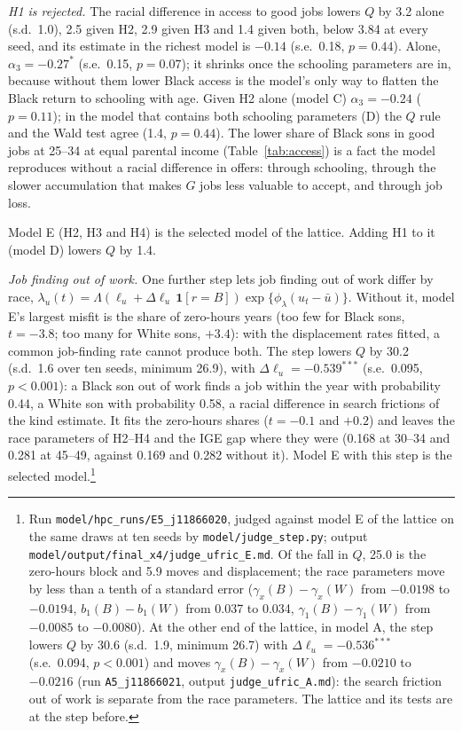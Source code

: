 \textit{H1 is rejected.} The racial difference in access to good jobs lowers $Q$ by 3.2 alone (s.d.\ 1.0), 2.5 given
H2, 2.9 given H3 and 1.4 given both, below 3.84 at every seed, and its estimate in the richest model is $-0.14$
(s.e.\ 0.18, $p = 0.44$). Alone, $\alpha_3 = -0.27^{*}$ (s.e.\ 0.15, $p = 0.07$); it shrinks once the schooling
parameters are in, because without them lower Black access is the model's only way to flatten the Black return to
schooling with age. Given H2 alone (model C) $\alpha_3 = -0.24$ ($p = 0.11$); in the model that contains both schooling
parameters (D) the $Q$ rule and the Wald test agree (1.4, $p = 0.44$). The lower share of Black sons in good jobs at 25--34 at equal parental income (Table~\ref{tab:access}) is a
fact the model reproduces without a racial difference in offers: through schooling, through the slower accumulation
that makes $G$ jobs less valuable to accept, and through job loss.

Model E (H2, H3 and H4) is the selected model of the lattice. Adding H1 to it (model D) lowers $Q$ by 1.4.

\textit{Job finding out of work.} One further step lets job finding out of work differ by race,
$\lambda_u(t) = \Lambda(\ell_u + \Delta\ell_u\, \mathbf 1[r = B])\exp\{\phi_\lambda(u_t - \bar u)\}$. Without it, model E's
largest misfit is the share of zero-hours years (too few for Black sons, $t = -3.8$; too many for White sons, $+3.4$):
with the displacement rates fitted, a common job-finding rate cannot produce both. The step lowers $Q$ by 30.2 (s.d.\
1.6 over ten seeds, minimum 26.9), with $\Delta\ell_u = -0.539^{***}$ (s.e.\ 0.095, $p < 0.001$): a Black son out of
work finds a job within the year with probability 0.44, a White son with probability 0.58, a racial difference in
search frictions of the kind \citet{bowlus2002discrimination} estimate. It fits the zero-hours shares ($t = -0.1$ and
$+0.2$) and leaves the race parameters of H2--H4 and the IGE gap where they were (0.168 at 30--34 and 0.281 at 45--49,
against 0.169 and 0.282 without it). Model E with this step is the selected model.\footnote{Run
\texttt{model/hpc\_runs/E5\_j11866020}, judged against model E of the lattice on the same draws at ten seeds by
\texttt{model/judge\_step.py}; output \texttt{model/output/final\_x4/judge\_ufric\_E.md}. Of the fall in $Q$,
25.0 is the zero-hours block and 5.9 moves and displacement; the race parameters move by less than a tenth of a
standard error ($\gamma_x(B) - \gamma_x(W)$ from $-0.0198$ to $-0.0194$, $b_1(B) - b_1(W)$ from 0.037 to 0.034,
$\gamma_1(B) - \gamma_1(W)$ from $-0.0085$ to $-0.0080$). At the other end of the lattice, in model A, the step
lowers $Q$ by 30.6 (s.d.\ 1.9, minimum 26.7) with $\Delta\ell_u = -0.536^{***}$ (s.e.\ 0.094, $p < 0.001$) and moves
$\gamma_x(B) - \gamma_x(W)$ from $-0.0210$ to $-0.0216$ (run \texttt{A5\_j11866021}, output
\texttt{judge\_ufric\_A.md}): the search friction out of work is separate from the race parameters. The lattice and its
tests are at the step before.}



